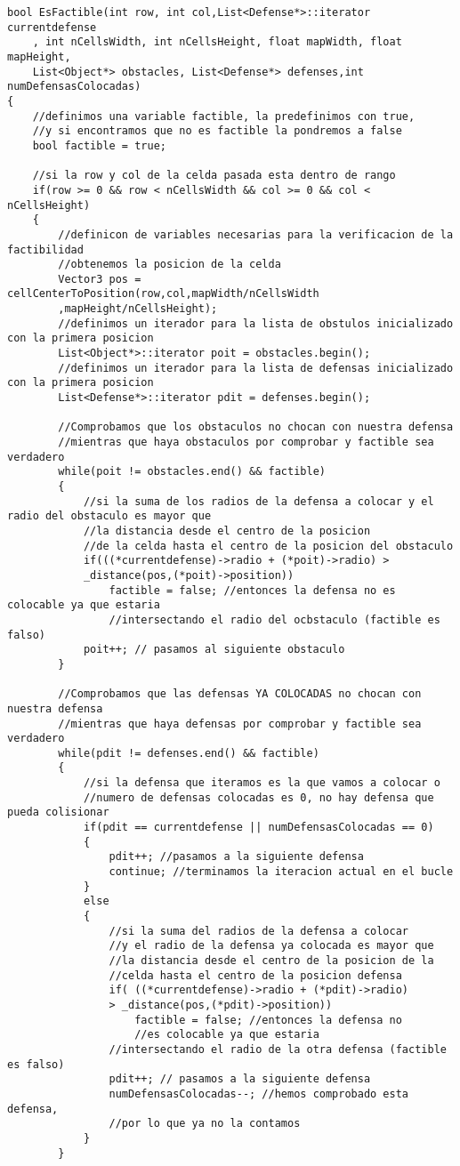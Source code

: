 \begin{lstlisting}[frame=single,basicstyle=\tiny,title={Función de factibilidad}]
bool EsFactible(int row, int col,List<Defense*>::iterator currentdefense
	, int nCellsWidth, int nCellsHeight, float mapWidth, float mapHeight, 
	List<Object*> obstacles, List<Defense*> defenses,int numDefensasColocadas)
{
	//definimos una variable factible, la predefinimos con true, 
	//y si encontramos que no es factible la pondremos a false
	bool factible = true; 
	
	//si la row y col de la celda pasada esta dentro de rango
	if(row >= 0 && row < nCellsWidth && col >= 0 && col < nCellsHeight) 
    {
		//definicon de variables necesarias para la verificacion de la factibilidad
		//obtenemos la posicion de la celda
		Vector3 pos = cellCenterToPosition(row,col,mapWidth/nCellsWidth
		,mapHeight/nCellsHeight);  
		//definimos un iterador para la lista de obstulos inicializado con la primera posicion
		List<Object*>::iterator poit = obstacles.begin(); 
		//definimos un iterador para la lista de defensas inicializado con la primera posicion
		List<Defense*>::iterator pdit = defenses.begin(); 

		//Comprobamos que los obstaculos no chocan con nuestra defensa
		//mientras que haya obstaculos por comprobar y factible sea verdadero
		while(poit != obstacles.end() && factible)	
		{
			//si la suma de los radios de la defensa a colocar y el radio del obstaculo es mayor que 
			//la distancia desde el centro de la posicion
			//de la celda hasta el centro de la posicion del obstaculo
			if(((*currentdefense)->radio + (*poit)->radio) > 
			_distance(pos,(*poit)->position)) 
				factible = false; //entonces la defensa no es colocable ya que estaria 
				//intersectando el radio del ocbstaculo (factible es falso)
			poit++; // pasamos al siguiente obstaculo
		}
		
		//Comprobamos que las defensas YA COLOCADAS no chocan con nuestra defensa
		//mientras que haya defensas por comprobar y factible sea verdadero
		while(pdit != defenses.end() && factible) 
		{
			//si la defensa que iteramos es la que vamos a colocar o 
			//numero de defensas colocadas es 0, no hay defensa que pueda colisionar
			if(pdit == currentdefense || numDefensasColocadas == 0) 
			{
				pdit++; //pasamos a la siguiente defensa
				continue; //terminamos la iteracion actual en el bucle
			}
			else
			{
				//si la suma del radios de la defensa a colocar 
				//y el radio de la defensa ya colocada es mayor que 
				//la distancia desde el centro de la posicion de la
				//celda hasta el centro de la posicion defensa
				if( ((*currentdefense)->radio + (*pdit)->radio) 
				> _distance(pos,(*pdit)->position))
					factible = false; //entonces la defensa no 
					//es colocable ya que estaria
				//intersectando el radio de la otra defensa (factible es falso)
				pdit++; // pasamos a la siguiente defensa
				numDefensasColocadas--; //hemos comprobado esta defensa, 
				//por lo que ya no la contamos
			}
		}


\end{lstlisting}
